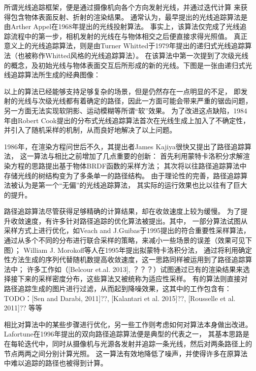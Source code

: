 所谓光线追踪框架，便是通过摄像机向各个方向发射光线，并通过迭代计算
来获得包含物体表面反射、折射的渲染结果。
通常认为，最早提出的光线追踪算法是由Arther Appel在1968年提出的光线投射算法\cite{RayCasting}。
事实上，该算法仅完成了光线追踪流程中的第一步，相机发射的光线在与物体相交之后便直接求得光照值。
真正意义上的光线追踪算法，则是由Turner Whitted于1979年提出的递归式光线追踪算法\cite{WhittedRayTracing}（也被称作Whitted风格的光线追踪算法）。
在该算法中第一次提到了次级光线的概念，及初始光线与物体表面交互后所形成的新的光线。下图是一张由递归式光线追踪算法所生成的经典图像：

以上的算法已经能够支持足够复杂的场景，但是仍然存在一点明显的不足，
即发射的光线与次级光线都有着确定的路径，因此一方面可能会带来严重的锯齿问题，
另一方面无法实现软阴影、运动模糊等所谓“软”效果。
为了改进这点缺陷，1984年由Robert Cook提出的分布式光线追踪算法\cite{DistributiveRayTracing}首次在光线生成上加入了不确定性，
并引入了随机采样的机制，从而良好地解决了以上问题。

1986年，在渲染方程问世后不久，其提出者James Kajiya很快又提出了路径追踪算法\cite{PathTracing}，
这一算法与相比之前增加了几点重要的创新：
首先利用蒙特卡洛积分求解渲染方程的思路提出基于物体BRDF函数的采样方法；
其次将以往路径追踪算法中存储光线的树结构变为了多条单一的路径结构。
由于理论性的完善，路径追踪算法被认为是第一个“无偏”的光线追踪算法，
其实际的运行效果也比以往有了巨大的提升。

路径追踪算法尽管获得足够精确的计算结果，却在收敛速度上较为缓慢。
为了提升收敛速度，有许多针对路径追踪的优化算法被提出。其中，
一部分算法试图从采样方式上进行优化，如Veach and J.Guibas于1995提出的符合重要性采样\cite{MultipleImportanceSampling}算法，
通过从多个不同的分布进行联合采样的策略，来减小一些场景的误差（效果可见下图）；
William J. Morokoff等人在1995年提出拟蒙特卡洛积分法\cite{QuasiMonteCarlo}，
通过将利用确定性方法生成的序列代替随机数提高收敛速度，这一思路同样被运用到了路径追踪算法中；
许多工作如（[Belcour et.al. 2013], ？？？）试图通过已有的渲染结果来选择接下来的采样密度分布，这些算法又被统称为适应性采样。
有的算法则直接对路径追踪生成的图片进行过滤，从而起到降噪效果，这其中的工作包含有：
TODO：[Sen and Darabi, 2011]??, [Kalantari et al. 2015]??, [Rousselle et al. 2011]??
等等

相比对算法中的某些步骤进行优化，另一些工作则考虑如何对算法本身做出改进。
Lafortune在1996年提出的双向路径追踪算法\cite{BidirectionalPathTracing}便是典型的代表之一，
其基本思路是在每轮迭代中，同时从摄像机与光源各发射并追踪一条光线，然后对两条路径上的节点两两之间分别计算光照。
这一算法有效地降低了噪声，并使得许多在原算法中难以追踪的路径也被得到计算。

